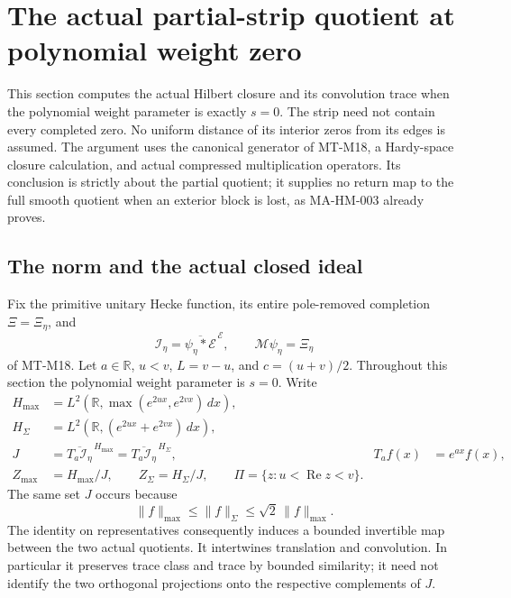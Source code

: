 \section{The actual partial-strip quotient at polynomial weight zero}
\label{sec:hardy-partial-strip}

This section computes the actual Hilbert closure and its convolution
trace when the polynomial weight parameter is exactly $s=0$.
The strip need not contain every completed zero.  No uniform distance
of its interior zeros from its edges is assumed.  The argument uses
the canonical generator of MT-M18, a Hardy-space closure calculation,
and actual compressed multiplication operators.  Its conclusion is
strictly about the partial quotient; it supplies no return map to the
full smooth quotient when an exterior block is lost, as MA-HM-003
already proves.

\subsection{The norm and the actual closed ideal}

Fix the primitive unitary Hecke function, its entire pole-removed
completion $\Xi=\Xi_\eta$, and
\[
 \mathcal I_\eta=\overline{\psi_\eta*\mathcal E}^{\,\mathcal E},
 \qquad \mathcal M\psi_\eta=\Xi_\eta
\]
of MT-M18.  Let $a\in\mathbb R$, $u<v$, $L=v-u$, and $c=(u+v)/2$.
Throughout this section the polynomial weight parameter is $s=0$.
Write
\[
 \begin{aligned}
 H_{\max}&=L^2(\mathbb R,\max(e^{2ux},e^{2vx})\,dx),\\
 H_\Sigma&=L^2(\mathbb R,(e^{2ux}+e^{2vx})\,dx),\\
 J&=\overline{T_a\mathcal I_\eta}^{\,H_{\max}}
   =\overline{T_a\mathcal I_\eta}^{\,H_\Sigma},
       &T_af(x)&=e^{ax}f(x),\\
 Z_{\max}&=H_{\max}/J,\qquad Z_\Sigma=H_\Sigma/J,\qquad
 \Pi=\{z:u<\operatorname{Re}z<v\}.
 \end{aligned}
 \tag{MA-HY.1}
\]
The same set $J$ occurs because
\[
       \|f\|_{\max}\le\|f\|_\Sigma\le\sqrt2\,\|f\|_{\max}.
 \tag{MA-HY.2}
\]
The identity on representatives consequently induces a bounded
invertible map between the two actual quotients.  It intertwines
translation and convolution.  In particular it preserves trace
class and trace by bounded similarity; it need not identify the
two orthogonal projections onto the respective complements of $J$.

